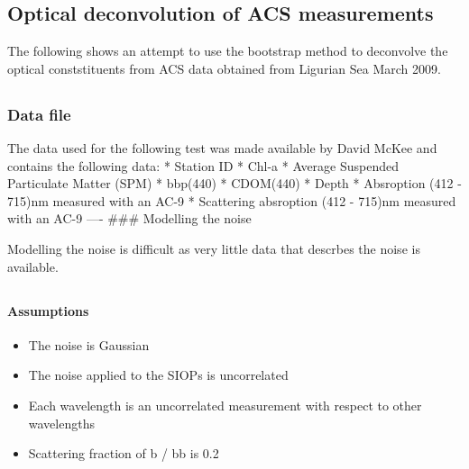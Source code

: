 \documentclass{article}
\begin{document}
\subsection{Optical deconvolution of ACS
measurements}\label{optical-deconvolution-of-acs-measurements}

The following shows an attempt to use the bootstrap method to deconvolve
the optical conststituents from ACS data obtained from Ligurian Sea
March 2009.

\subsection{}\label{section-1}

\subsubsection{Data file}\label{data-file}

The data used for the following test was made available by David McKee
and contains the following data: * Station ID * Chl-a * Average
Suspended Particulate Matter (SPM) * bbp(440) * CDOM(440) * Depth *
Absroption (412 - 715)nm measured with an AC-9 * Scattering absroption
(412 - 715)nm measured with an AC-9 ---- \#\#\# Modelling the noise

Modelling the noise is difficult as very little data that descrbes the
noise is available.

\subsection{}\label{section-2}

\paragraph{Assumptions}\label{assumptions}

\begin{itemize}
\itemsep1pt\parskip0pt
\item
  The noise is Gaussian
\item
  The noise applied to the SIOPs is uncorrelated
\item
  Each wavelength is an uncorrelated measurement with respect to other
  wavelengths
\item
  Scattering fraction of b / bb is 0.2
\end{itemize}

\subsection{}\label{section-3}
\end{document}
